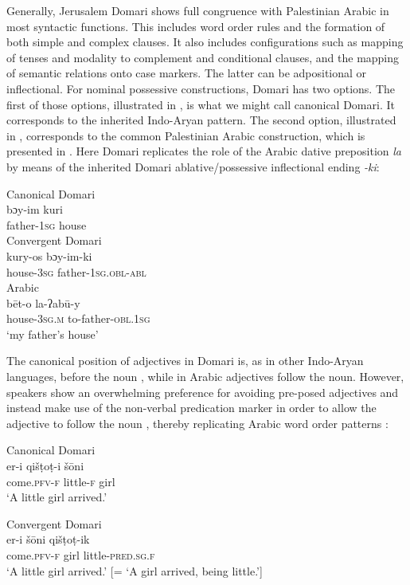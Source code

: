 \documentclass[output=paper]{langsci/langscibook}
\begin{document}
Generally, Jerusalem Domari shows full congruence with Palestinian Arabic in most syntactic functions. This includes word order rules and the formation of both simple and complex clauses. It also includes configurations such as mapping of tenses and modality to complement and conditional clauses, and the mapping of semantic relations onto case markers. The latter can be adpositional or inflectional. For nominal possessive constructions, Domari has two options. The first of those options, illustrated in , is what we might call canonical Domari. It corresponds to the inherited Indo-Aryan pattern. The second option, illustrated in , corresponds to the common Palestinian Arabic construction, which is presented in . Here Domari replicates the role of the Arabic dative preposition \textit{la} by means of the inherited Domari ablative/possessive inflectional ending \textit{-ki}:

\ea
\ea
{Canonical Domari}\\
\gll bɔy-im kuri    \\
     father-\textsc{1sg} house\\ \label{kuri}
\ex
{Convergent Domari}\\
\gll kury-os bɔy-im-ki  \\
       house-\textsc{3sg} father-\textsc{1sg.obl-abl}\\ \label{boy}
\ex
{Arabic}\\
\gll bēt-o la-ʔabū-y  \\
       house-\textsc{3sg.m} to-father-\textsc{obl.1sg}\\
\glt   ‘my father’s house’ \label{bett}
\z
\z

The canonical position of adjectives in Domari is, as in other Indo-Aryan languages, before the noun , while in Arabic adjectives follow the noun. However, speakers show an overwhelming preference for avoiding pre-posed adjectives and instead make use of the non-verbal predication marker in order to allow the adjective to follow the noun , thereby replicating Arabic word order patterns :

\ea\label{girls}
\ea
{Canonical Domari}\\
\gll er-i qišṭoṭ-i šōni  \\
       come.\textsc{pfv-f} little-\textsc{f} girl\\
\glt   ‘A little girl arrived.’ \label{girla}

\newpage

\ex
{Convergent Domari}\\
\gll   er-i šōni qišṭoṭ-ik  \\
       come.\textsc{pfv-f} girl little-\textsc{pred.sg.f}\\
\glt   ‘A little girl arrived.’ [= ‘A girl arrived, being little.’] \label{girlb}
\end{document}
